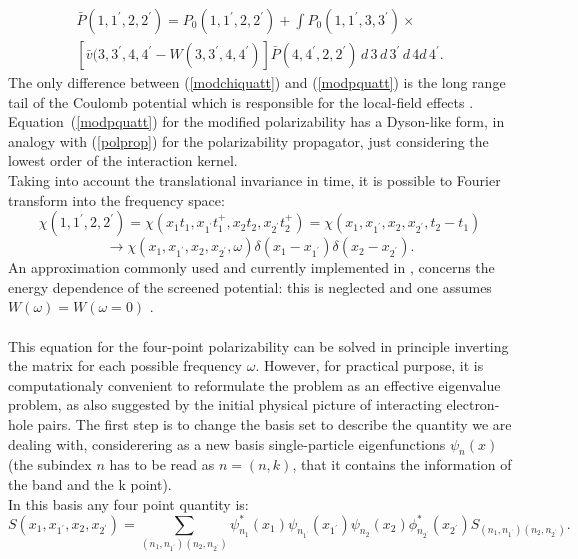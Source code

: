 \documentclass[11pt]{article}
\begin{document}
\begin{multline}\label{modpquatt}
\bar{P}(1,1^{\prime},2,2^{\prime}) = P_{0}(1,1^{\prime},2,2^{\prime}) + \int P_{0}(1,1^{\prime},3,3^{\prime})\times \\
\left[ \bar{v}(3,3^{\prime},4,4^{\prime} - W(3,3^{\prime},4,4^{\prime})\right] \bar{P}(4,4^{\prime},2,2^{\prime})\,d\,3\,d\,3^{\prime}\,d\,4d\,4^{\prime}.
\end{multline}
The only difference between (\ref{modchiquatt}) and (\ref{modpquatt}) is the
long range tail of the Coulomb potential which is responsible for the local-field effects \cite{onid+02rmp}.
Equation~(\ref{modpquatt}) for the modified polarizability has a Dyson-like form,
 in analogy with (\ref{polprop}) for the polarizability propagator, just considering
 the lowest order of the interaction kernel.\\
Taking into account the translational invariance in time, it
 is possible to Fourier transform into the frequency space:
\begin{equation} \nonumber
\chi(1,1^{\prime},2,2^{\prime}) =
\chi(x_{1}t_{1},x_{1^{\prime}}t^{+}_{1},x_{2}t_{2},x_{2^{\prime}}t^{+}_{2})
                      = \chi(x_{1},x_{1^{\prime}},x_{2},x_{2^{\prime}}, t_{2} - t_{1})
\end{equation}
\begin{equation}
\to \chi(x_{1},x_{1^{\prime}},x_{2},x_{2^{\prime}}, \omega)\delta(x_{1} - x_{1^{\prime}})\delta(x_{2} - x_{2^{\prime}}).
\end{equation}
An approximation commonly used and currently implemented in \SAX, concerns the energy dependence of the screened potential:
 this is neglected and one assumes $W(\omega) = W(\omega=0)$ \cite{rohl-loui00prb}. 
\\
\\
This equation for the four-point polarizability can be solved in principle inverting the matrix
for each possible frequency $\omega$. However, for practical purpose, it is computationaly 
convenient to reformulate the problem as an effective eigenvalue problem, 
as also suggested by the initial physical picture of interacting
electron-hole pairs. The first step is to change the basis set to describe the quantity we are dealing with, considerering as
a new basis single-particle eigenfunctions $\psi_{n}(x)$ (the subindex $n$ has to
be read as $n=(n,k)$, that it contains the 
information of the band and the k point).\\
In this basis any four point quantity is:
\begin{equation}
S(x_{1},x_{1^{\prime}},x_{2},x_{2^{\prime}}) = \sum_{(n_{1},n_{1^{\prime}})(n_{2},n_{2^{\prime}})}
\psi^{*}_{n_{1}}(x_{1})\psi_{n_{1^{\prime}}}(x_{1^{\prime}})\psi_{n_{2}}(x_{2})\phi^{*}_{n_{2^{\prime}}}(x_{2^{\prime}}) S_{(n_{1},n_{1^{\prime}})(n_{2},n_{2^{\prime}})}.
\end{equation}
\end{document}
